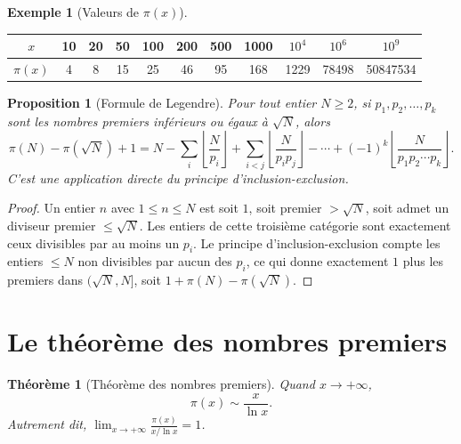 \documentclass[12pt,a4paper,openany]{book}
\theoremstyle{definition}
\newtheorem{exemple}[definition]{Exemple}
\theoremstyle{plain}
\newtheorem{theoreme}[definition]{Théorème}
\newtheorem{proposition}[definition]{Proposition}
\theoremstyle{remark}
\newcommand{\floor}[1]{\left\lfloor #1 \right\rfloor}
\begin{document}
\begin{exemple}[Valeurs de $\pi(x)$]
\label{ex:pi_valeurs}
\begin{center}
\begin{tabular}{c*{10}{c}}
\toprule
$x$ & 10 & 20 & 50 & 100 & 200 & 500 & 1000 & $10^4$ & $10^6$ & $10^9$ \\
\midrule
$\pi(x)$ & 4 & 8 & 15 & 25 & 46 & 95 & 168 & 1229 & 78498 & 50847534 \\
\bottomrule
\end{tabular}
\end{center}
\end{exemple}

\begin{proposition}[Formule de Legendre]
\label{prop:legendre}
Pour tout entier $N \geq 2$, si $p_1, p_2, \ldots, p_k$ sont les nombres premiers
inférieurs ou égaux à $\sqrt{N}$, alors
\[
  \pi(N) - \pi(\sqrt{N}) + 1
  = N - \sum_{i} \floor{\frac{N}{p_i}}
  + \sum_{i < j} \floor{\frac{N}{p_i p_j}}
  - \cdots
  + (-1)^k \floor{\frac{N}{p_1 p_2 \cdots p_k}}.
\]
C'est une application directe du principe d'inclusion-exclusion.
\end{proposition}

\begin{proof}
Un entier $n$ avec $1 \leq n \leq N$ est soit $1$, soit premier $> \sqrt{N}$, soit
admet un diviseur premier $\leq \sqrt{N}$. Les entiers de cette troisième catégorie
sont exactement ceux divisibles par au moins un $p_i$. Le principe
d'inclusion-exclusion compte les entiers $\leq N$ non divisibles par aucun des $p_i$,
ce qui donne exactement $1$ plus les premiers dans $(\sqrt{N}, N]$, soit
$1 + \pi(N) - \pi(\sqrt{N})$.
\end{proof}

\section{Le théorème des nombres premiers}
\label{sec:ch2:pnt}


\begin{theoreme}[Théorème des nombres premiers]
\label{thm:pnt}
Quand $x \to +\infty$,
\[
  \pi(x) \sim \frac{x}{\ln x}.
\]
Autrement dit, $\displaystyle\lim_{x \to +\infty} \frac{\pi(x)}{x / \ln x} = 1$.
\end{theoreme}
\end{document}
